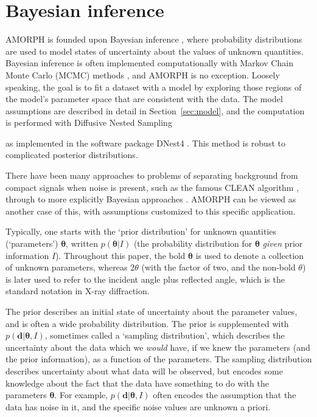 \documentclass[review]{elsarticle}
\newcommand{\params}{\boldsymbol{\theta}}
\newcommand{\data}{\boldsymbol{d}}
\newcommand{\info}{I}
\newcommand{\changed}{\color{blue}}
\begin{document}
\section{Bayesian inference}\label{sec:bayes}
AMORPH is founded upon Bayesian inference
\citep{gregory2005bayesian, o2004kendall, sivia2006data}, where
probability distributions are used to model
states of uncertainty about the values of unknown quantities.
Bayesian inference is often implemented computationally with
Markov Chain Monte Carlo (MCMC) methods \citep{mackay2003}, and AMORPH is no exception.
Loosely speaking, the goal is to fit a dataset with a model by exploring
those regions of the model's parameter space that are consistent with the
data. The model assumptions are described in detail in
Section~\ref{sec:model}, and the computation is performed with
Diffusive Nested Sampling {\changed \citep[an advanced MCMC method][]{dns}
as implemented in the software package DNest4 \citep{dnest4}.
This method is robust to complicated posterior distributions.

There have been many approaches to
problems of separating background from compact signals
when noise is present, such as the famous CLEAN algorithm \citep{clean},
through to more explicitly Bayesian approaches
\citep[e.g.][]{padayachee, massinf, object, hobson, worpel}.
AMORPH can be viewed as another
case of this, with assumptions customized to this specific application.}

Typically, one starts with the `prior distribution'
for unknown quantities (`parameters') $\params$, written $p(\params | \info)$
(the probability distribution for $\params$ {\em given} prior information
$\info$). Throughout this paper, the bold $\params$ is used to denote a
collection of unknown parameters, whereas $2\theta$ (with the factor of two, and the
non-bold $\theta$) is later used to
refer to the incident angle plus reflected angle, which is the
standard notation in X-ray diffraction. 

The prior describes an initial state of uncertainty about the
parameter values, and is often a wide probability distribution.
The prior is supplemented with $p(\data | \params, \info)$, sometimes
called a `sampling distribution',
which describes the uncertainty about the data which we {\em would} have,
if we knew the parameters (and the prior information), as a function of
the parameters. {\changed The sampling distribution} describes uncertainty about what data will be observed,
but encodes some knowledge about the fact that the data have something to do with the
parameters $\params$. For example, $p(\data | \params, \info)$ often encodes
the assumption that the data has noise in it, and the specific noise values
are unknown a priori.
\end{document}
